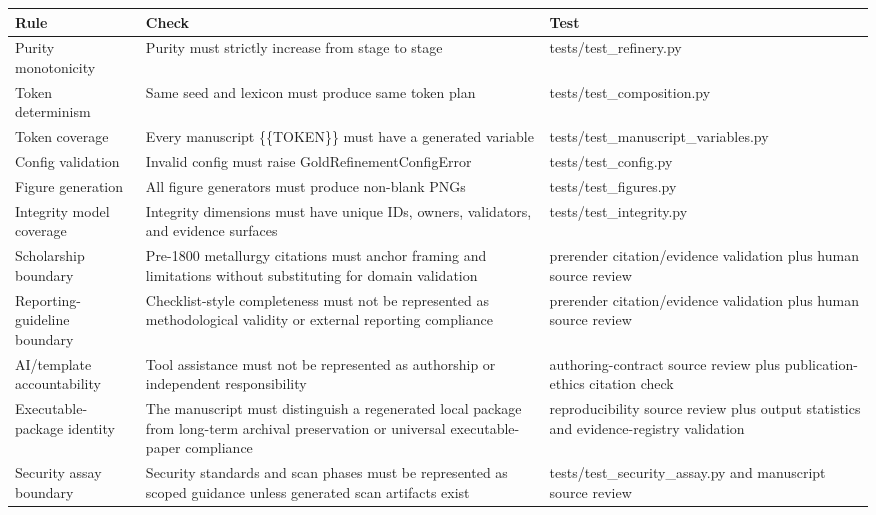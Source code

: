 \documentclass[
]{article}
\newcounter{none} %
\begin{document}
{\def\LTcaptype{none} %
\begin{longtable}[]{@{}
  >{\raggedright\arraybackslash}p{}
  >{\raggedright\arraybackslash}p{}
  >{\raggedright\arraybackslash}p{}@{}}
\toprule\noalign{}
\begin{minipage}[b]{\linewidth}\raggedright
Rule
\end{minipage} & \begin{minipage}[b]{\linewidth}\raggedright
Check
\end{minipage} & \begin{minipage}[b]{\linewidth}\raggedright
Test
\end{minipage} \\
\midrule\noalign{}
\endhead
\bottomrule\noalign{}
\endlastfoot
Purity monotonicity & Purity must strictly increase from stage to stage
& tests/test\_refinery.py \\
Token determinism & Same seed and lexicon must produce same token plan &
tests/test\_composition.py \\
Token coverage & Every manuscript \{\{TOKEN\}\} must have a generated
variable & tests/test\_manuscript\_variables.py \\
Config validation & Invalid config must raise GoldRefinementConfigError
& tests/test\_config.py \\
Figure generation & All figure generators must produce non-blank PNGs &
tests/test\_figures.py \\
Integrity model coverage & Integrity dimensions must have unique IDs,
owners, validators, and evidence surfaces & tests/test\_integrity.py \\
Scholarship boundary & Pre-1800 metallurgy citations must anchor framing
and limitations without substituting for domain validation & prerender
citation/evidence validation plus human source review \\
Reporting-guideline boundary & Checklist-style completeness must not be
represented as methodological validity or external reporting compliance
& prerender citation/evidence validation plus human source review \\
AI/template accountability & Tool assistance must not be represented as
authorship or independent responsibility & authoring-contract source
review plus publication-ethics citation check \\
Executable-package identity & The manuscript must distinguish a
regenerated local package from long-term archival preservation or
universal executable-paper compliance & reproducibility source review
plus output statistics and evidence-registry validation \\
Security assay boundary & Security standards and scan phases must be
represented as scoped guidance unless generated scan artifacts exist &
tests/test\_security\_assay.py and manuscript source review \\
\end{longtable}
}
\end{document}

